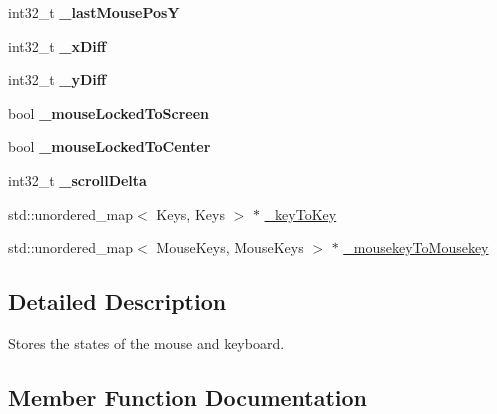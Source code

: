 \begin{DoxyCompactItemize}
\item 
int32\+\_\+t {\bfseries \+\_\+last\+Mouse\+PosY}\hypertarget{class_ensum_1_1_input_1_1_input_ab200b39064859018de01ca5b2268ead0}{}\label{class_ensum_1_1_input_1_1_input_ab200b39064859018de01ca5b2268ead0}

\item 
int32\+\_\+t {\bfseries \+\_\+x\+Diff}\hypertarget{class_ensum_1_1_input_1_1_input_a66b1bd677e8eb78accfecb848e499920}{}\label{class_ensum_1_1_input_1_1_input_a66b1bd677e8eb78accfecb848e499920}

\item 
int32\+\_\+t {\bfseries \+\_\+y\+Diff}\hypertarget{class_ensum_1_1_input_1_1_input_a10bedefb4e3e85f0cb1d42f125e349f6}{}\label{class_ensum_1_1_input_1_1_input_a10bedefb4e3e85f0cb1d42f125e349f6}

\item 
bool {\bfseries \+\_\+mouse\+Locked\+To\+Screen}\hypertarget{class_ensum_1_1_input_1_1_input_ab48463bb35239ca17a85812d170b80eb}{}\label{class_ensum_1_1_input_1_1_input_ab48463bb35239ca17a85812d170b80eb}

\item 
bool {\bfseries \+\_\+mouse\+Locked\+To\+Center}\hypertarget{class_ensum_1_1_input_1_1_input_a0aa9fd5f126984184a8393ef4356c243}{}\label{class_ensum_1_1_input_1_1_input_a0aa9fd5f126984184a8393ef4356c243}

\item 
int32\+\_\+t {\bfseries \+\_\+scroll\+Delta}\hypertarget{class_ensum_1_1_input_1_1_input_a86b2566b93f5ddbf30c3eaf738e2d3d2}{}\label{class_ensum_1_1_input_1_1_input_a86b2566b93f5ddbf30c3eaf738e2d3d2}

\item 
std\+::unordered\+\_\+map$<$ Keys, Keys $>$ $\ast$ \hyperlink{class_ensum_1_1_input_1_1_input_a230c41d8d2b8a4df41d432036310c1ab}{\+\_\+key\+To\+Key}
\item 
std\+::unordered\+\_\+map$<$ Mouse\+Keys, Mouse\+Keys $>$ $\ast$ \hyperlink{class_ensum_1_1_input_1_1_input_a254dcd129224a0604bd0a5e4cb45b7e6}{\+\_\+mousekey\+To\+Mousekey}
\end{DoxyCompactItemize}


\subsection{Detailed Description}
Stores the states of the mouse and keyboard. 

\subsection{Member Function Documentation}
